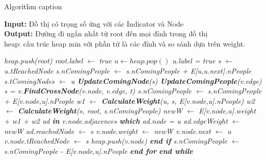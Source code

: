 \documentclass{article}
\begin{document}
    \begin{algorithm}
    \caption{Algorithm caption}
    \label{alg:algorithm-label}
    \textbf{Input:} Đồ thị có trọng số ứng với các Indicator và Node\\
    \textbf{Output:} Đường đi ngắn nhất từ root đến mọi đỉnh trong đồ thị\\
    heap: cấu trúc heap min với phần tử là các đỉnh và so sánh dựa 
    trên weight.
    \begin{algorithmic}[1]
        \em
        \State heap.push(root)
        \State root.label $\gets$ true
        \State $u \gets heap.pop()$
        \State u.label = true
        \State s $\gets$ u.tReachedNode
        \State s.nComingPeople $\gets$ s.nComingPeople + E[u,u.next].nPeople
        \State s.tComingNodes $\gets$ u
        \State \textbf{UpdateComingNode}(s)
        \State \textbf{UpdateComingPeople}(v.edge)
        \EndFor
        \State s = v.\textbf{FindCrossNode}(v.node, v.edge, t)
        \State s.nComingPeople $\gets$ s.nComingPeople + E[v.node,u].nPeople
        \State w1 $\gets$ \textbf{CalculateWeight}(u, s, E[v.node,u].nPeople)
        \State w2 $\gets$ \textbf{CalculateWeight}(s, root, s.nComingPeople)
        \State newW $\gets$ E[v.node,u].weight + w1 + w2
        \State ad \textbf{in} v.node.adjacences \textbf{which} ad.node = u
        \State ad.edgeWeight $\gets$ newW
        \State ad.reachedNode $\gets$ s
        \State v.node.weight $\gets$ newW
        \State v.node.next $\gets$ u 
        \State v.node.tReachedNode $\gets$ s
        \State heap.push(v.node)
        \EndIf
        \State \textbf{end if}
        \State s.nComingPeople $\gets$ s.nComingPeople - E[v.node,u].nPeople
        \EndFor
        \textbf{end for}
        \EndWhile
        \textbf{end while}
    \EndProcedure
    \end{algorithmic}
    \end{algorithm}
    
\end{document}
